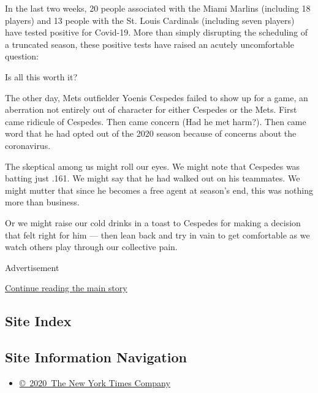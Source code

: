 In the last two weeks, 20 people associated with the Miami Marlins
(including 18 players) and 13 people with the St. Louis Cardinals
(including seven players) have tested positive for Covid-19. More than
simply disrupting the scheduling of a truncated season, these positive
tests have raised an acutely uncomfortable question:

Is all this worth it?

The other day, Mets outfielder Yoenis Cespedes failed to show up for a
game, an aberration not entirely out of character for either Cespedes or
the Mets. First came ridicule of Cespedes. Then came concern (Had he met
harm?). Then came word that he had opted out of the 2020 season because
of concerns about the coronavirus.

The skeptical among us might roll our eyes. We might note that Cespedes
was batting just .161. We might say that he had walked out on his
teammates. We might mutter that since he becomes a free agent at
season's end, this was nothing more than business.

Or we might raise our cold drinks in a toast to Cespedes for making a
decision that felt right for him --- then lean back and try in vain to
get comfortable as we watch others play through our collective pain.

Advertisement

\protect\hyperlink{after-bottom}{Continue reading the main story}

\hypertarget{site-index}{%
\subsection{Site Index}\label{site-index}}

\hypertarget{site-information-navigation}{%
\subsection{Site Information
Navigation}\label{site-information-navigation}}

\begin{itemize}
\tightlist
\item
  \href{https://help.nytimes.com/hc/en-us/articles/115014792127-Copyright-notice}{©~2020~The
  New York Times Company}
\end{itemize}

